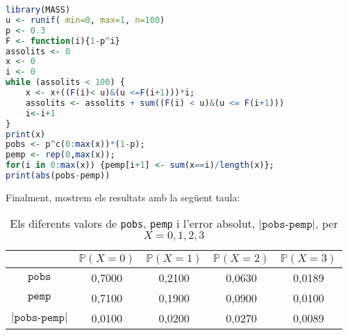 \documentclass[11pt,a4paper]{article}
\begin{document}
\begin{lstlisting}[language=R, caption={Programa del problema 2},xleftmargin=.08\textwidth,xrightmargin=.08\textwidth]
library(MASS)
u <- runif( min=0, max=1, n=100)
p <- 0.3
F <- function(i){1-p^i}
assolits <- 0
x <- 0
i <- 0
while (assolits < 100) {
    x <- x+((F(i)< u)&(u <=F(i+1)))*i;
    assolits <- assolits + sum((F(i) < u)&(u <= F(i+1)))
    i<-i+1
}
print(x)
pobs <- p^c(0:max(x))*(1-p);
pemp <- rep(0,max(x));
for(i in 0:max(x)) {pemp[i+1] <- sum(x==i)/length(x)};
print(abs(pobs-pemp))
\end{lstlisting}
Finalment, mostrem els resultats amb la següent taula:
\begin{table}[ht]
  \centering
  \begin{tabular}{c||c|c|c|c|}
    \cline{2-5}
                            & $\mathbb{P}(X=0)$ & $\mathbb{P}(X=1)$ & $\mathbb{P}(X=2)$ & $\mathbb{P}(X=3)$ \\
    \hline\hline \multicolumn{1}{|c||}{
    $\texttt{pobs}$}        & 0,7000            & 0,2100            & 0,0630            & 0,0189            \\
    \hline \multicolumn{1}{|c||}{
    $\texttt{pemp}$}        & 0,7100            & 0,1900            & 0,0900            & 0,0100            \\
    \hline \multicolumn{1}{|c||}{
    $|\texttt{pobs-pemp}|$} & 0,0100            & 0,0200            & 0,0270            & 0,0089            \\
    \hline
  \end{tabular}
  \caption{Els diferents valors de \texttt{pobs}, \texttt{pemp} i l'error absolut, $|\texttt{pobs-pemp}|$, per $X={0,1,2,3}$}
  \label{pr2-2}
\end{table}
\end{document}

